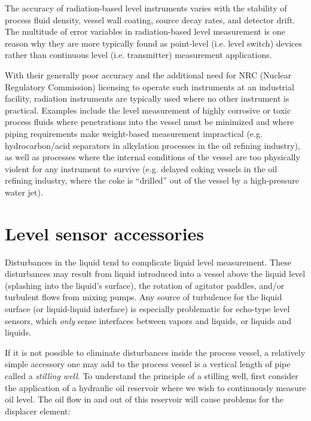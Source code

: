 \vskip 10pt

The accuracy of radiation-based level instruments varies with the stability of process fluid density, vessel wall coating, source decay rates, and detector drift.  The multitude of error variables in radiation-based level measurement is one reason why they are more typically found as point-level (i.e. level switch) devices rather than continuous level (i.e. transmitter) measurement applications.  

With their generally poor accuracy and the additional need for NRC (Nuclear Regulatory Commission) licensing to operate such instruments at an industrial facility, radiation instruments are typically used where no other instrument is practical.  Examples include the level measurement of highly corrosive or toxic process fluids where penetrations into the vessel must be minimized and where piping requirements make weight-based measurement impractical (e.g. hydrocarbon/acid separators in alkylation processes in the oil refining industry), as well as processes where the internal conditions of the vessel are too physically violent for any instrument to survive (e.g. delayed coking vessels in the oil refining industry, where the coke is ``drilled'' out of the vessel by a high-pressure water jet).    








\filbreak
\section{Level sensor accessories}

Disturbances in the liquid tend to complicate liquid level measurement.  These disturbances may result from liquid introduced into a vessel above the liquid level (splashing into the liquid's surface), the rotation of agitator paddles, and/or turbulent flows from mixing pumps.  Any source of turbulence for the liquid surface (or liquid-liquid interface) is especially problematic for echo-type level sensors, which \textit{only} sense interfaces between vapors and liquids, or liquids and liquids.  

If it is not possible to eliminate disturbances inside the process vessel, a relatively simple accessory one may add to the process vessel is a vertical length of pipe called a \textit{stilling well}.  To understand the principle of a stilling well, first consider the application of a hydraulic oil reservoir where we wish to continuously measure oil level.  The oil flow in and out of this reservoir will cause problems for the displacer element: 


